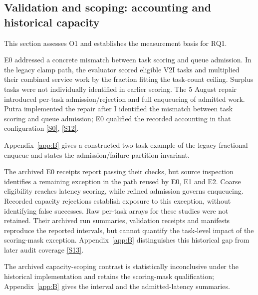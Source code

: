 \documentclass[12pt,a4paper]{article}
\begin{document}
\FloatBarrier
\subsection{Validation and scoping: accounting and historical capacity}\label{sec:3.1}

This section assesses O1 and establishes the measurement basis for RQ1.

E0 addressed a concrete mismatch between task scoring and queue admission. In the legacy clamp path, the evaluator scored eligible V2I tasks and multiplied their combined service work by the fraction fitting the task-count ceiling. Surplus tasks were not individually identified in earlier scoring. The 5 August repair introduced per-task admission/rejection and full enqueueing of admitted work. Putra implemented the repair after I identified the mismatch between task scoring and queue admission; E0 qualified the recorded accounting in that configuration \hyperref[source-s0]{[S0]}, \hyperref[source-s12]{[S12]}.

Appendix~\ref{app:B} gives a constructed two-task example of the legacy fractional enqueue and states the admission/failure partition invariant.

The archived E0 receipts report passing their checks, but source inspection identifies a remaining exception in the  path reused by E0, E1 and E2. Coarse eligibility reaches latency scoring, while refined admission governs enqueueing. Recorded capacity rejections establish exposure to this exception, without identifying false successes. Raw per-task arrays for these studies were not retained. Their archived run summaries, validation receipts and manifests reproduce the reported intervals, but cannot quantify the task-level impact of the scoring-mask exception. Appendix~\ref{app:B} distinguishes this historical gap from later audit coverage \hyperref[source-s13]{[S13]}.

The archived capacity-scoping contrast is statistically inconclusive under the historical implementation and retains the scoring-mask qualification; Appendix~\ref{app:B} gives the interval and the admitted-latency summaries.
\end{document}
